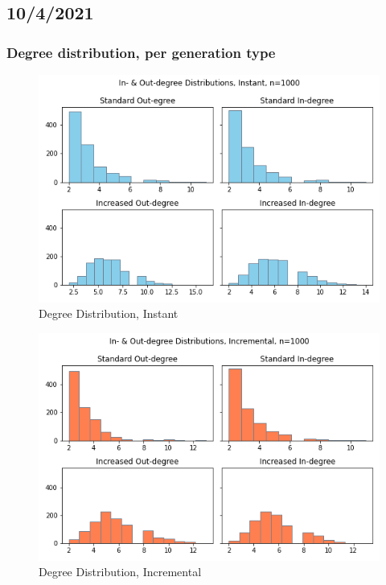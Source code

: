 \documentclass{article}
\begin{document}
\subsection{10/4/2021}

\subsubsection{Degree distribution, per generation type}

\begin{center}
    \begin{figure}[!htbp]
        \centering
        \includegraphics[width=.8\textwidth]{ThesisKI/Images/InstantDegree.png}
        \caption{Degree Distribution, Instant}
        \label{degree:instant}
    \end{figure}
\end{center}
\begin{center}
    \begin{figure}[!htbp]
        \centering
        \includegraphics[width=.8\textwidth]{ThesisKI/Images/IncrementalDegree.png}
        \caption{Degree Distribution, Incremental}
        \label{degree:incremental}
    \end{figure}
\end{center}
\end{document}
